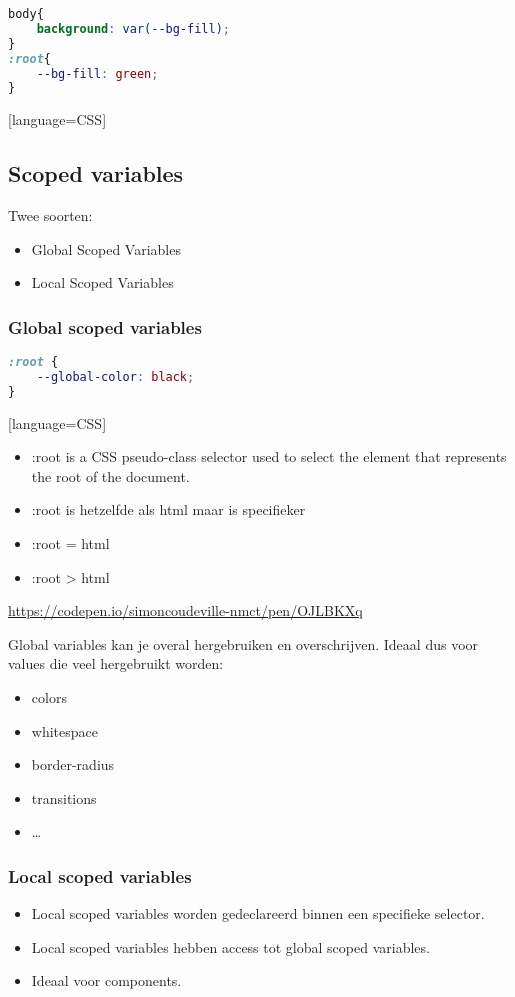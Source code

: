 \documentclass{article}
\begin{document}
\begin{lstlisting}[language=CSS]
body{
    background: var(--bg-fill);
}
:root{
    --bg-fill: green;
}

\end{lstlisting}[language=CSS]

\subsection{Scoped variables}

Twee soorten:
\begin{itemize}
    \item Global Scoped Variables
    \item Local Scoped Variables
\end{itemize}

\subsubsection{Global scoped variables}

\begin{lstlisting}[language=CSS]
:root {
    --global-color: black;
}
\end{lstlisting}[language=CSS]
\begin{itemize}
    \item :root is a CSS pseudo-class selector used to select the element that represents the root of the document.
    \item :root is hetzelfde als html maar is specifieker
    \item :root = html
    \item :root > html
\end{itemize}

\url{https://codepen.io/simoncoudeville-nmct/pen/OJLBKXq}

Global variables kan je overal hergebruiken en overschrijven. Ideaal dus voor values die veel hergebruikt worden:

\begin{itemize}
    \item colors
    \item whitespace
    \item border-radius
    \item transitions
    \item \dots
\end{itemize}

\subsubsection{Local scoped variables}
\begin{itemize}
    \item Local scoped variables worden gedeclareerd binnen een specifieke selector.
    \item Local scoped variables hebben access tot global scoped variables.
    \item Ideaal voor components.
\end{itemize}
\end{document}

